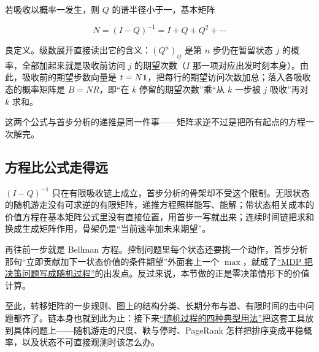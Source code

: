 若吸收以概率一发生，则 \(Q\) 的谱半径小于一，基本矩阵

\[
N=(I-Q)^{-1}=I+Q+Q^2+\cdots
\]

良定义。级数展开直接读出它的含义：\((Q^n)_{ij}\) 是第 \(n\) 步仍在暂留状态 \(j\) 的概率，全部加起来就是吸收前访问 \(j\) 的期望次数（\(I\) 那一项对应出发时刻本身）。由此，吸收前的期望步数向量是 \(t=N\mathbf{1}\)，把每行的期望访问次数加总；落入各吸收态的概率矩阵是 \(B=NR\)，即``在 \(k\) 停留的期望次数''乘``从 \(k\) 一步被 \(j\) 吸收''再对 \(k\) 求和。

这两个公式与首步分析的递推是同一件事——矩阵求逆不过是把所有起点的方程一次解完。

\subsection{方程比公式走得远}

\((I-Q)^{-1}\) 只在有限吸收链上成立，首步分析的骨架却不受这个限制。无限状态的随机游走没有可求逆的有限矩阵，递推方程照样能写、能解；带状态相关成本的价值方程在基本矩阵公式里没有直接位置，用首步一写就出来；连续时间链把求和换成生成矩阵作用，骨架仍是``当前速率加未来期望''。

再往前一步就是 Bellman 方程。控制问题里每个状态还要挑一个动作，首步分析那句``立即贡献加下一状态价值的条件期望''外面套上一个 \(\max\)，就成了\hyperref[sec:16-Control-and-Reinforcement-Learning/02-Reinforcement-Learning/01]{``MDP 把决策问题写成随机过程''}的出发点。反过来说，本节做的正是零决策情形下的价值计算。

至此，转移矩阵的一步规则、图上的结构分类、长期分布与谱、有限时间的击中问题都齐了。链本身也就到此为止：接下来\hyperref[ch:049]{``随机过程的四种典型用法''}把这套工具放到具体问题上——随机游走的尺度、鞅与停时、PageRank 怎样把排序变成平稳概率，以及状态不可直接观测时该怎么办。
